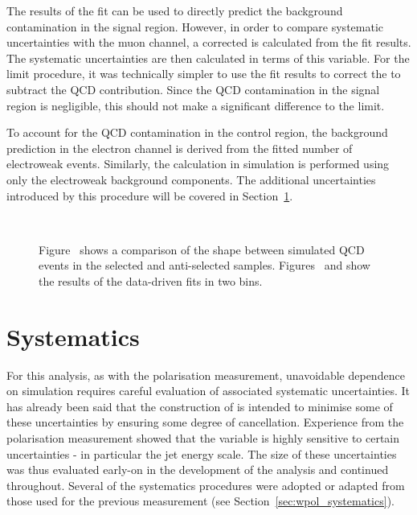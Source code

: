 The results of the fit can be used to directly predict the background
contamination in the signal region. However, in order to compare systematic
uncertainties with the muon channel, a corrected \RCS is calculated from the fit
results. The systematic uncertainties are then calculated in terms of this
variable. For the limit procedure, it was technically simpler to use the fit
results to correct the \NControl to subtract the \ac{QCD} contribution. Since
the \ac{QCD} contamination in the signal region is negligible, this should not
make a significant difference to the limit.

To account for the \ac{QCD} contamination in the control
region, the background prediction in the electron channel is derived from the
fitted number of electroweak events. Similarly, the \RCS calculation in
simulation is performed using only the electroweak background components. The
additional uncertainties introduced by this procedure will be covered in
Section~\ref{sec:susy_systematics}.

\begin{figure}
\centering
{}\quad\\
\quad
{}
\caption[]{Figure~ shows a comparison of the \LP
  shape between simulated \ac{QCD} events in the selected and anti-selected
  samples. Figures~ and
   show the results of the data-driven fits
  in two \STlep bins.}
\label{fig:susy_elqcd}
\end{figure}

\section{Systematics}
\label{sec:susy_systematics}
For this analysis, as with the \PW polarisation measurement, unavoidable
dependence on simulation requires careful evaluation of associated systematic
uncertainties. It has already been said that the construction of \RCS is
intended to minimise some of these uncertainties by ensuring some degree of
cancellation. Experience from the \PW polarisation measurement showed that the
\LP variable is highly sensitive to certain uncertainties - in particular the
jet energy scale. The size of these uncertainties was thus evaluated early-on in
the development of the analysis and continued throughout. Several of the
systematics procedures were adopted or adapted from those used for the previous
measurement (see Section~\ref{sec:wpol_systematics}).

